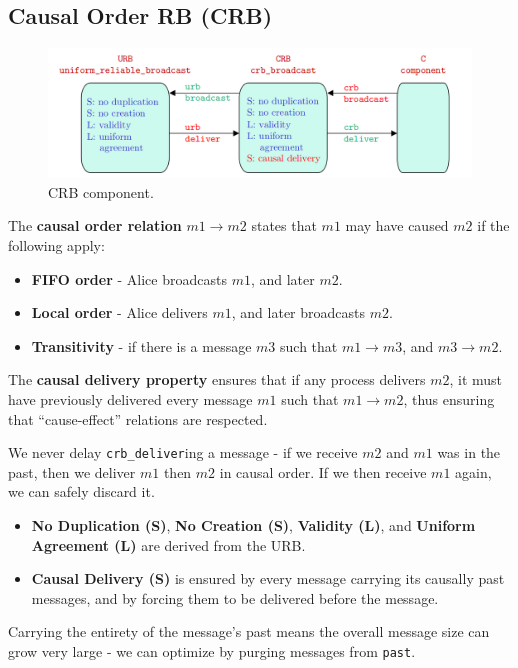 \documentclass[11pt]{article}
\begin{document}
\subsection{Causal Order RB (CRB)}
\begin{figure}[htb!]
  \centering
  \caption{CRB component.}
  \includegraphics[scale=0.3]{crb}
\end{figure}

The \textbf{causal order relation} $m1 \rightarrow m2$ states that $m1$ may have caused $m2$ if the following apply:
\begin{itemize}
  \item \textbf{FIFO order} - Alice broadcasts $m1$, and later $m2$.
  \item \textbf{Local order} - Alice delivers $m1$, and later broadcasts $m2$.
  \item \textbf{Transitivity} - if there is a message $m3$ such that $m1 \rightarrow m3$, and $m3 \rightarrow m2$.
\end{itemize}

The \textbf{causal delivery property} ensures that if any process delivers $m2$, it must have previously delivered every message $m1$ such that $m1 \rightarrow m2$, thus ensuring that ``cause-effect'' relations are respected.

We never delay \texttt{crb\_deliver}ing a message - if we receive $m2$ and $m1$ was in the past, then we deliver $m1$ then $m2$ in causal order.
If we then receive $m1$ again, we can safely discard it.
\begin{itemize}
  \item \textbf{No Duplication (S)}, \textbf{No Creation (S)}, \textbf{Validity (L)}, and \textbf{Uniform Agreement (L)} are derived from the URB.
  \item \textbf{Causal Delivery (S)} is ensured by every message carrying its causally past messages, and by forcing them to be delivered before the message.
\end{itemize}
Carrying the entirety of the message's past means the overall message size can grow very large - we can optimize by purging messages from \texttt{past}.
\end{document}
